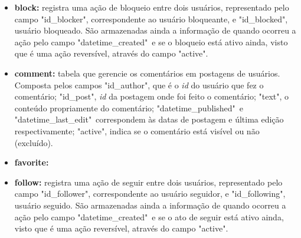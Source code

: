 \documentclass[cic,tc]{iiufrgs}
\begin{document}
\begin{itemize}
    \item \textbf{block:} registra uma ação de bloqueio entre dois usuários, representado pelo campo "id\_blocker", correspondente ao usuário bloqueante, e "id\_blocked", usuário bloqueado. São armazenadas ainda a informação de quando ocorreu a ação pelo campo "datetime\_created"\ e se o bloqueio está ativo ainda, visto que é uma ação reversível, através do campo "active".
    
    \item \textbf{comment:} tabela que gerencie os comentários em postagens de usuários. Composta pelos campos "id\_author", que é o \textit{id} do usuário que fez o comentário; "id\_post", \textit{id} da postagem onde foi feito o comentário; "text", o conteúdo propriamente do comentário; "datetime\_published"\ e "datetime\_last\_edit"\ correspondem às datas de postagem e última edição respectivamente; "active", indica se o comentário está visível ou não (excluído).
    
    \item \textbf{favorite:} 
    
    \item \textbf{follow:} registra uma ação de seguir entre dois usuários, representado pelo campo "id\_follower", correspondente ao usuário seguidor, e "id\_following", usuário seguido. São armazenadas ainda a informação de quando ocorreu a ação pelo campo "datetime\_created"\ e se o ato de seguir está ativo ainda, visto que é uma ação reversível, através do campo "active".
    

\end{itemize}
\end{document}
